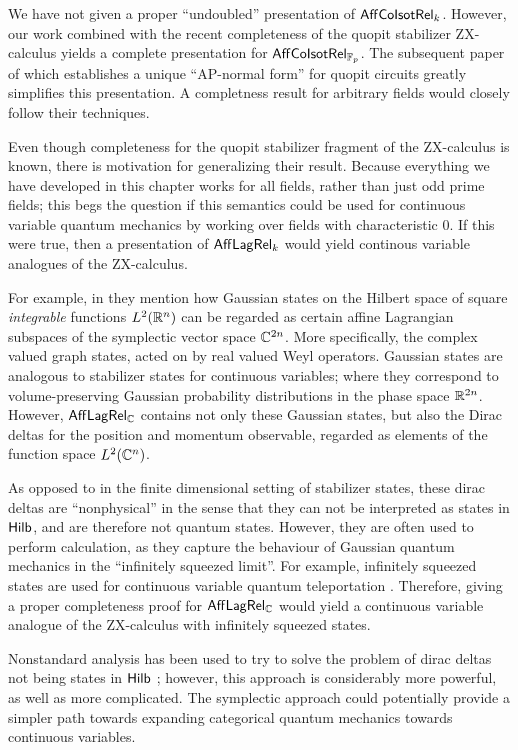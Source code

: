  

We have not given a proper ``undoubled''  presentation of $\mathsf{Aff}{\sf Co}{\sf Isot}\mathsf{Rel}_k$.  However, our work combined with the recent completeness of the quopit stabilizer ZX-calculus \cite{booth} yields a complete presentation for $\mathsf{Aff}{\sf Co}{\sf Isot}\mathsf{Rel}_{\mathbb{F}_p}$. The subsequent paper of \cite{poor} which establishes a unique ``AP-normal form'' for quopit circuits greatly simplifies this presentation.  A completness result for arbitrary fields would closely follow their techniques.

Even though completeness for the quopit stabilizer fragment of the ZX-calculus is known, there is motivation for generalizing their result.
Because everything we have developed in this chapter works for all fields, rather than just odd prime fields; this begs the question if this semantics could be used for continuous variable quantum mechanics by working over fields with characteristic 0.  If this were true, then a presentation of $\mathsf{Aff}\mathsf{Lag}\mathsf{Rel}_k$ would yield continous variable analogues of the ZX-calculus.

 For example, in \cite{gross} they mention how  Gaussian states on the Hilbert space of square {\em integrable} functions $L^2(\mathbb{R}^n)$ can be regarded as certain  affine Lagrangian subspaces of the symplectic vector space $\mathbb{C}^{2n}$.  More specifically, the  complex valued graph states, acted on by real valued Weyl operators. 
Gaussian states are analogous to stabilizer states for continuous variables; where they correspond to volume-preserving Gaussian probability distributions in the phase space $\mathbb{R}^{2n}$.
However,  $\mathsf{Aff}\mathsf{Lag}\mathsf{Rel}_{\mathbb{C}}$ contains not only these Gaussian states, but also the Dirac deltas for the position and momentum observable, regarded as elements of the function space  $L^2(\mathbb{C}^n)$.

As opposed to in the finite dimensional setting of stabilizer states,   these   dirac deltas are ``nonphysical'' in the sense that they can not be interpreted as states in $\mathsf{Hilb}$, and are therefore not quantum states.  However, they are often used  to perform calculation, as they capture the behaviour of Gaussian quantum mechanics in the ``infinitely squeezed limit''.  For example, infinitely squeezed states are used for continuous variable quantum teleportation \cite{Milburn1999}. Therefore, giving a proper completeness proof for $\mathsf{Aff}\mathsf{Lag}\mathsf{Rel}_{\mathbb{C}}$ would yield a continuous variable analogue of the ZX-calculus with infinitely squeezed states.

Nonstandard analysis has been used to try to solve the problem of dirac deltas not being states in $\mathsf{Hilb}$  \cite{Gogioso2017}; however, this approach is considerably more powerful, as well as more complicated.  The symplectic approach could potentially provide a simpler path towards expanding categorical quantum mechanics towards continuous variables.

